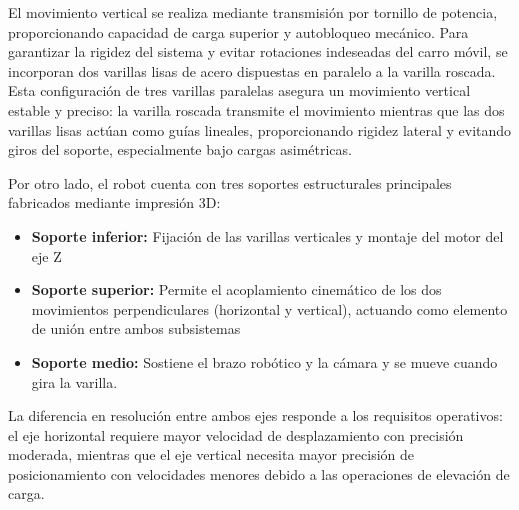 El movimiento vertical se realiza mediante transmisión por tornillo de potencia, proporcionando capacidad de carga superior y autobloqueo mecánico. Para garantizar la rigidez del sistema y evitar rotaciones indeseadas del carro móvil, se incorporan dos varillas lisas de acero dispuestas en paralelo a la varilla roscada. Esta configuración de tres varillas paralelas asegura un movimiento vertical estable y preciso: la varilla roscada transmite el movimiento mientras que las dos varillas lisas actúan como guías lineales, proporcionando rigidez lateral y evitando giros del soporte, especialmente bajo cargas asimétricas.

Por otro lado, el robot cuenta con tres soportes estructurales principales fabricados mediante impresión 3D:

\begin{itemize}
    \item \textbf{Soporte inferior:} Fijación de las varillas verticales y montaje del motor del eje Z
    \item \textbf{Soporte superior:} Permite el acoplamiento cinemático de los dos movimientos perpendiculares (horizontal y vertical), actuando como elemento de unión entre ambos subsistemas
    \item \textbf{Soporte medio:} Sostiene el brazo robótico y la cámara y se mueve cuando gira la varilla.
\end{itemize}

La diferencia en resolución entre ambos ejes responde a los requisitos operativos: el eje horizontal requiere mayor velocidad de desplazamiento con precisión moderada, mientras que el eje vertical necesita mayor precisión de posicionamiento con velocidades menores debido a las operaciones de elevación de carga.